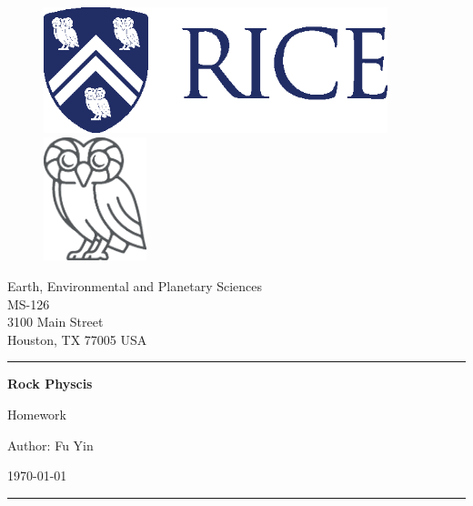 
\begin{titlepage}

\begin{figure}[htbp]
    \centering
    \includegraphics[width=10cm]{figures/Rice_Logo_280_Blue.eps}
    \hfill
    \includegraphics[width=3cm]{figures/Rice_Owl_Flat_425_Gray.eps}
\end{figure}


\vspace{-0.5cm}
\begin{flushright}
    {\small Earth, Environmental and Planetary Sciences}\\
    {\small MS-126}\\
    {\small 3100 Main Street}\\
    {\small Houston, TX 77005 USA}
\end{flushright}
\hrule
\vspace{1cm}


{\LARGE\noindent \textbf{Rock Physcis} \par}
\vspace{0.3cm}
{\Large\noindent Homework \par}
\vspace{2cm}
{\LARGE\noindent Author: Fu Yin \par}
\vspace{0.5cm}
{\Large\noindent \today \par}
\vspace{7cm}
\hrule



\end{titlepage}
